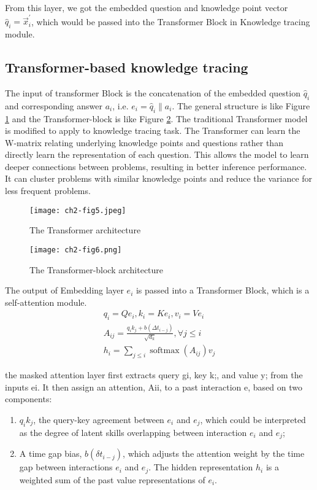 
From this layer, we got the embedded question and knowledge point vector $\hat{q}_{i} =  \vec{x}_{i}^{\prime}$, which would be passed into the Transformer Block in Knowledge tracing module.

\subsection{Transformer-based knowledge tracing}

The input of transformer Block is the concatenation of the embedded question $\hat{q}_{i}$ and corresponding answer $a_i$, i.e. $e_i=\hat{q}_{i}\|a_i$. The general structure is like Figure \ref{fig5} and the Transformer-block is like Figure \ref{fig6}. The traditional Transformer model is modified to apply to knowledge tracing task. The Transformer can learn the W-matrix relating underlying knowledge points and questions rather than directly learn the representation of each question. This allows the model to learn deeper connections between problems, resulting in better inference performance. It can cluster problems with similar knowledge points and reduce the variance for less frequent problems.
\begin{figure}[h]
	\centering
	\texttt{[image: ch2-fig5.jpeg]}
	\caption{The Transformer architecture}
	\label{fig5}
\end{figure}

\begin{figure}[h]
	\centering
	\texttt{[image: ch2-fig6.png]}
	\caption{The Transformer-block architecture}
	\label{fig6}
\end{figure}

The output of Embedding layer $e_i$ is passed into a Transformer Block, which is a self-attention module. 
$$
\begin{array}{c}
q_{i}=Q e_{i}, k_{i}=K e_{i}, v_{i}=V e_{i} \\
A_{i j}=\frac{q_{i} k_{j}+b\left(\Delta t_{i-j}\right)}{\sqrt{d_{k}}}, \forall j \leq i \\
h_{i}=\sum_{j \leq i} \operatorname{softmax}\left(A_{i j}\right) v_{j}
\end{array}
$$

the masked attention layer first extracts query gi, key k;, and value y; from the inputs ei. It then assign an attention, Aii, to a past interaction e, based on two components: 
\begin{enumerate}
  \item $q_i k_j$, the query-key agreement between $e_i$ and $e_j$, which could be interpreted as the degree of latent skills overlapping between interaction $e_i$ and $e_j$;
  \item A time gap bias, $b(\delta t_{i-j})$, which adjusts the attention weight by the time gap between interactions $e_i$ and $e_j$. The hidden representation $h_i$ is a weighted sum of the past value representations of $e_i$.
\end{enumerate}


